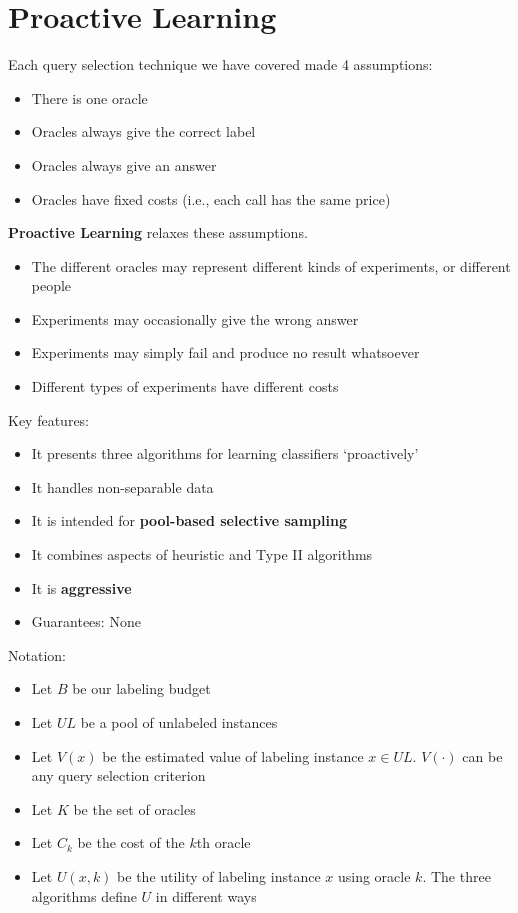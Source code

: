 \documentclass[10pt]{article}
\begin{document}
\section*{Proactive Learning}
Each query selection technique we have covered made 4 assumptions:
\begin{itemize}
	\item There is one oracle
	\item Oracles always give the correct label
	\item Oracles always give an answer
	\item Oracles have fixed costs (i.e., each call has the same price)
\end{itemize}
\textbf{Proactive Learning} relaxes these assumptions.
\begin{itemize}
	\item The different oracles may represent different kinds of experiments, or different people
	\item Experiments may occasionally give the wrong answer
	\item Experiments may simply fail and produce no result whatsoever
	\item Different types of experiments have different costs
\end{itemize}
Key features:
\begin{itemize}
	\item It presents three algorithms for learning classifiers `proactively'
	\item It handles non-separable data
	\item It is intended for \textbf{pool-based selective sampling}
	\item It combines aspects of heuristic and Type II algorithms
	\item It is \textbf{aggressive}
	\item Guarantees: None
\end{itemize}
Notation:
\begin{itemize}
	\item Let $B$ be our labeling budget
	\item Let $UL$ be a pool of unlabeled instances
	\item Let $V(x)$ be the estimated value of labeling instance $x \in UL$.  $V(\cdot)$ can be any query selection criterion
	\item Let $K$ be the set of oracles
	\item Let $C_k$ be the cost of the $k$th oracle
	\item Let $U(x, k)$ be the utility of labeling instance $x$ using oracle $k$.  The three algorithms define $U$ in different ways
\end{itemize}
\end{document}
